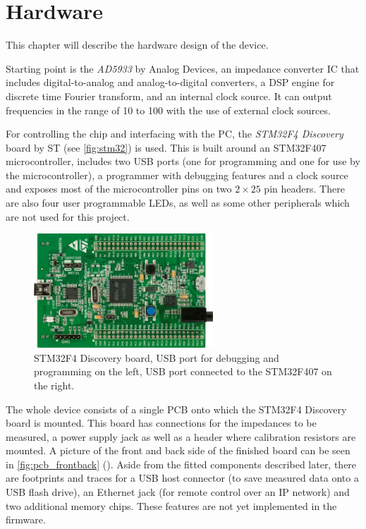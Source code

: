 \chapter{Hardware} \label{sec:hardware}

This chapter will describe the hardware design of the device.

Starting point is the \emph{AD5933} by Analog Devices, an impedance converter IC that includes digital-to-analog and
analog-to-digital converters, a DSP engine for discrete time Fourier transform, and an internal clock source. It can
output frequencies in the range of \unit{10}{\hertz} to \unit{100}{\kilo\hertz} with the use of external clock sources.

For controlling the chip and interfacing with the PC, the \emph{STM32F4 Discovery} board by ST (see \autoref{fig:stm32})
is used. This is built around an STM32F407 microcontroller, includes two USB ports (one for programming and one for use
by the microcontroller), a programmer with debugging features and a clock source and exposes most of the microcontroller
pins on two $ 2 \times 25 $ pin headers. There are also four user programmable LEDs, as well as some other peripherals
which are not used for this project.

\begin{figure}[htpb]
  \centering
    \includegraphics[width=0.6\textwidth]{bilder/stm32.jpg}
  \caption{STM32F4 Discovery board, USB port for debugging and programming on the left, USB port connected to the
    STM32F407 on the right.}
  \label{fig:stm32}
\end{figure}

The whole device consists of a single PCB onto which the STM32F4 Discovery board is mounted. This board has connections
for the impedances to be measured, a power supply jack as well as a header where calibration resistors are mounted.
A picture of the front and back side of the finished board can be seen in \autoref{fig:pcb_frontback}
(). Aside from the fitted components described later, there are footprints and traces
for a USB host connector (to save measured data onto a USB flash drive), an Ethernet jack (for remote control over
an IP network) and two additional memory chips. These features are not yet implemented in the firmware.

